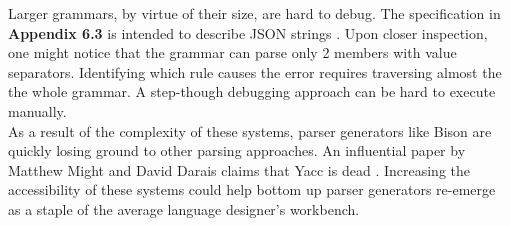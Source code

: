 Larger grammars, by virtue of their size, are hard to debug. The specification in \textbf{Appendix 6.3} is intended to describe JSON strings \cite{BrayTim}. Upon closer inspection, one might notice that the grammar can parse only 2 members with value separators. 
Identifying which rule causes the error requires traversing almost the the whole grammar. A step-though debugging approach can be hard to execute manually.\\

As a result of the complexity of these systems, parser generators like Bison are quickly losing ground to other parsing approaches. An influential paper by Matthew Might and David Darais claims that Yacc is dead \cite{Yaccisdead}. Increasing the accessibility of these systems could help bottom up parser generators re-emerge as a staple of the average language designer's workbench.  
